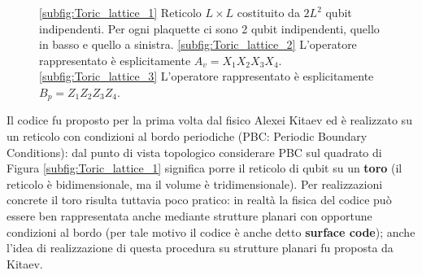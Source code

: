 \begin{figure}[!h]
	\caption{\eqref{subfig:Toric_lattice_1} Reticolo $L \times L$ costituito da $2L^2$ qubit indipendenti. Per ogni plaquette ci sono 2 qubit indipendenti, quello in basso e quello a sinistra. \eqref{subfig:Toric_lattice_2} L'operatore rappresentato è esplicitamente $A_v = X_1 X_2 X_3 X_4$. \eqref{subfig:Toric_lattice_3} L'operatore rappresentato è esplicitamente $B_p = Z_1 Z_2 Z_3 Z_4$.}
    \label{fig:Toric_lattice}
\end{figure}

\noindent Il codice fu proposto per la prima volta dal fisico Alexei Kitaev ed è realizzato su un reticolo con condizioni al bordo periodiche (PBC: Periodic Boundary Conditions): dal punto di vista topologico considerare PBC sul quadrato di Figura \ref{subfig:Toric_lattice_1} significa porre il reticolo di qubit su un \textbf{toro} (il reticolo è bidimensionale, ma il volume è tridimensionale). Per realizzazioni concrete il toro risulta tuttavia poco pratico: in realtà la fisica del codice può essere ben rappresentata anche mediante strutture planari con opportune condizioni al bordo (per tale motivo il codice è anche detto \textbf{surface code}); anche l'idea di realizzazione di questa procedura su strutture planari fu proposta da Kitaev.


